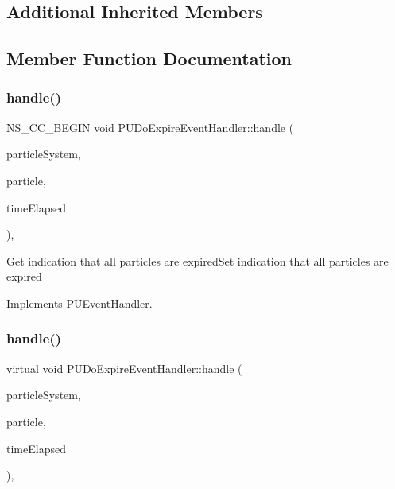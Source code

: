 \subsection*{Additional Inherited Members}


\subsection{Member Function Documentation}
\mbox{\label{classPUDoExpireEventHandler_a28cf9f9bea21b57152c12c52ff6eff91}} 
\subsubsection{\texorpdfstring{handle()}{handle()}\hspace{0.1cm}{\footnotesize\ttfamily [1/2]}}
{\footnotesize\ttfamily N\+S\+\_\+\+C\+C\+\_\+\+B\+E\+G\+IN void P\+U\+Do\+Expire\+Event\+Handler\+::handle (\begin{DoxyParamCaption}\item[{\hyperlink{classPUParticleSystem3D}{P\+U\+Particle\+System3D} $\ast$}]{particle\+System,  }\item[{\hyperlink{structPUParticle3D}{P\+U\+Particle3D} $\ast$}]{particle,  }\item[{float}]{time\+Elapsed }\end{DoxyParamCaption})\hspace{0.3cm}{\ttfamily [override]}, {\ttfamily [virtual]}}

Get indication that all particles are expired\+Set indication that all particles are expired 

Implements \hyperlink{classPUEventHandler_a760172609708c65548dcac364c9b3b9c}{P\+U\+Event\+Handler}.

\mbox{\label{classPUDoExpireEventHandler_a13edfa6a313f4306bb4815c670d98689}} 
\subsubsection{\texorpdfstring{handle()}{handle()}\hspace{0.1cm}{\footnotesize\ttfamily [2/2]}}
{\footnotesize\ttfamily virtual void P\+U\+Do\+Expire\+Event\+Handler\+::handle (\begin{DoxyParamCaption}\item[{\hyperlink{classPUParticleSystem3D}{P\+U\+Particle\+System3D} $\ast$}]{particle\+System,  }\item[{\hyperlink{structPUParticle3D}{P\+U\+Particle3D} $\ast$}]{particle,  }\item[{float}]{time\+Elapsed }\end{DoxyParamCaption})\hspace{0.3cm}{\ttfamily [override]}, {\ttfamily [virtual]}}

